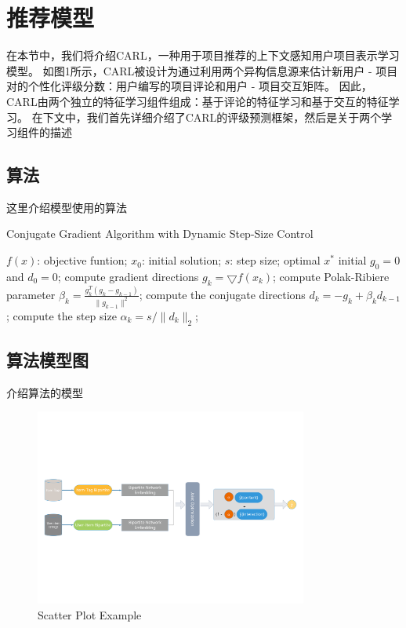 \documentclass[lang=cn,11pt]{elegantpaper}
\begin{document}
\section{推荐模型}

在本节中，我们将介绍CARL，一种用于项目推荐的上下文感知用户项目表示学习模型。 如图1所示，CARL被设计为通过利用两个异构信息源来估计新用户 - 项目对的个性化评级分数：用户编写的项目评论和用户 - 项目交互矩阵。 因此，CARL由两个独立的特征学习组件组成：基于评论的特征学习和基于交互的特征学习。 在下文中，我们首先详细介绍了CARL的评级预测框架，然后是关于两个学习组件的描述

\subsection{算法}

这里介绍模型使用的算法

\begin{algorithm}[h]  
	\caption{Conjugate Gradient Algorithm with Dynamic Step-Size Control}  
	\label{alg::conjugateGradient}  
	\begin{algorithmic}[1]  
		\Require  
		$f(x)$: objective funtion;  
		$x_0$: initial solution;  
		$s$: step size;  
		\Ensure  
		optimal $x^{*}$  
		\State initial $g_0=0$ and $d_0=0$;  
		\Repeat  
		\State compute gradient directions $g_k=\bigtriangledown f(x_k)$;  
		\State compute Polak-Ribiere parameter $\beta_k=\frac{g_k^{T}(g_k-g_{k-1})}{\parallel g_{k-1} \parallel^{2}}$;  
		\State compute the conjugate directions $d_k=-g_k+\beta_k d_{k-1}$;  
		\State compute the step size $\alpha_k=s/\parallel d_k \parallel_{2}$;  
	\end{algorithmic}  
\end{algorithm}  




\subsection{算法模型图}

介绍算法的模型

\begin{figure}[h]
	\centering
	\includegraphics[width=0.8\textwidth]{imgs/test.png}
	\caption{Scatter Plot Example \label{fig:scatter}}
\end{figure}
\end{document}
